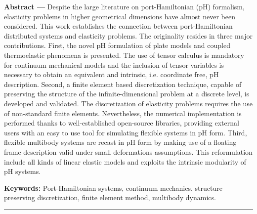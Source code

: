 \begin{vcenterpage}
{\large\textbf{Abstract ---}}  
Despite the large literature on port-Hamiltonian (pH) formalism, elasticity problems in higher geometrical dimensions have almost never been considered.  This work establishes the connection between port-Hamiltonian distributed systems and elasticity problems. The originality resides in three major contributions. First, the novel pH formulation of plate models and coupled thermoelastic phenomena is presented. The use of tensor calculus is mandatory for continuum mechanical models and the inclusion of tensor variables is necessary to obtain an equivalent and intrinsic, i.e. coordinate free, pH description. Second, a finite element based discretization technique, capable of preserving the structure of the infinite-dimensional problem at a discrete level, is developed and validated. The discretization of elasticity problems requires the use of non-standard finite elements. Nevertheless, the numerical implementation is performed thanks to well-established open-source libraries, providing external users with an easy to use tool for simulating flexible systems in pH form. Third, flexible multibody systems are recast in pH form by making use of a floating frame description valid under small deformations assumptions. This reformulation include all kinds of linear elastic models and exploits the intrinsic modularity of pH systems.

{\large\textbf{Keywords:}}
    Port-Hamiltonian systems, continuum mechanics, structure preserving discretization, finite element method, multibody dynamics.
\\
\noindent\rule[2pt]{\textwidth}{0.5pt}
\end{vcenterpage}

